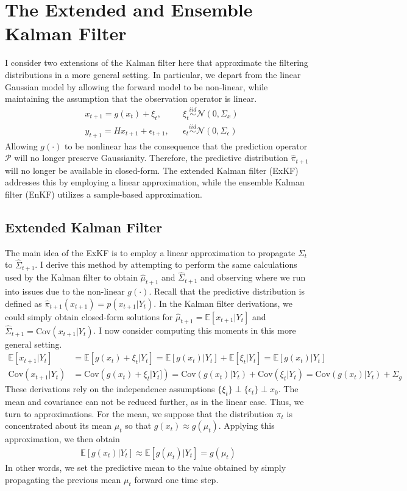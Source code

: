 \documentclass[12pt]{article}
\newcommand{\E}{\mathbb{E}}
\newcommand{\Cov}{\mathrm{Cov}}
\begin{document}
\section{The Extended and Ensemble Kalman Filter}
I consider two extensions of the Kalman filter here that approximate the filtering distributions in a more general setting. In particular, we depart from the linear 
Gaussian model by allowing the forward model to be non-linear, while maintaining the assumption that the observation operator is linear. 
\begin{align}
&x_{t + 1} = g(x_t) + \xi_t, && \xi_t \overset{iid}{\sim} \mathcal{N}(0, \Sigma_x) \\
&y_{t + 1} = Hx_{t+1} + \epsilon_{t+1}, && \epsilon_t \overset{iid}{\sim} \mathcal{N}(0, \Sigma_\epsilon) \nonumber 
\end{align}
Allowing $g(\cdot)$ to be nonlinear has the consequence that the prediction operator $\mathcal{P}$ will no longer preserve Gaussianity. Therefore, the predictive 
distribution $\hat{\pi}_{t+1}$ will no longer be available in closed-form. The extended Kalman filter (ExKF) addresses this by employing a linear approximation, while 
the ensemble Kalman filter (EnKF) utilizes a sample-based approximation. 

\subsection{Extended Kalman Filter}
The main idea of the ExKF is to employ a linear approximation to propagate $\Sigma_t$ to $\hat{\Sigma}_{t + 1}$. I derive this method by attempting to perform the same 
calculations used by the Kalman filter to obtain $\hat{\mu}_{t + 1}$ and $\hat{\Sigma}_{t + 1}$ and observing where we run into issues due to the non-linear $g(\cdot)$. 
Recall that the predictive distribution is defined as $\hat{\pi}_{t + 1}(x_{t+1}) = p(x_{t+1}|Y_t)$. In the Kalman filter derivations, we could simply obtain closed-form 
solutions for $\hat{\mu}_{t + 1} = \E[x_{t + 1}|Y_t]$ and $\hat{\Sigma}_{t+1} = \Cov(x_{t+1}|Y_t)$. I now consider computing this moments in this more general setting. 
\begin{align*}
\E[x_{t + 1}|Y_t] &= \E\left[g(x_t) + \xi_t|Y_t\right] = \E\left[g(x_t)|Y_t\right] + \E[\xi_t|Y_t] = \E\left[g(x_t)|Y_t\right] \\
\Cov(x_{t+1}|Y_t) &= \Cov\left(g(x_t) + \xi_t|Y_t]\right) = \Cov\left(g(x_t)|Y_t\right) + \Cov(\xi_t|Y_t) = \Cov\left(g(x_t)|Y_t\right) + \Sigma_g
\end{align*}
These derivations rely on the independence assumptions $\{\xi_t\} \perp \{\epsilon_t\} \perp x_0$. The mean and covariance can not be reduced further, as in the linear 
case. Thus, we turn to approximations. For the mean, we suppose that the distribution $\pi_t$ is concentrated about its mean $\mu_t$ so that $g(x_t) \approx g(\mu_t)$. 
Applying this approximation, we then obtain  
\begin{align*}
\E\left[g(x_t)|Y_t\right] \approx \E\left[g(\mu_t) |Y_t \right] = g(\mu_t)
\end{align*}
In other words, we set the predictive mean to the value obtained by simply propagating the previous mean $\mu_t$ forward one time step. 
\end{document}
